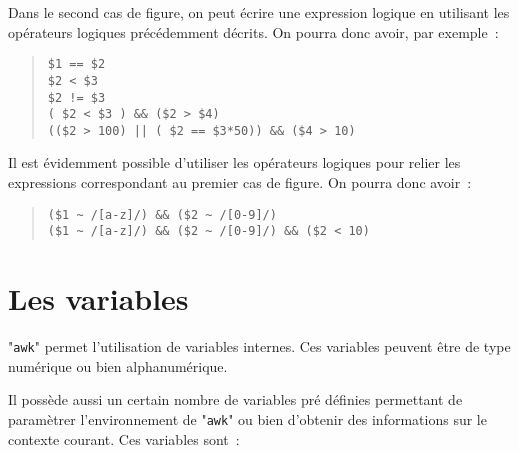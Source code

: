 Dans le second cas de figure, on peut {\'e}crire une expression logique en utilisant
les op{\'e}rateurs logiques pr{\'e}c{\'e}demment d{\'e}crits. On pourra donc avoir, par exemple~:
\begin{quote}
\begin{verbatim}
$1 == $2
$2 < $3
$2 != $3
( $2 < $3 ) && ($2 > $4)
(($2 > 100) || ( $2 == $3*50)) && ($4 > 10)
\end{verbatim}
\end{quote}

Il est {\'e}videmment possible d'utiliser les op{\'e}rateurs logiques pour relier les
expressions correspondant au premier cas de figure. On pourra donc avoir~:
\begin{quote}
\begin{verbatim}
($1 ~ /[a-z]/) && ($2 ~ /[0-9]/)
($1 ~ /[a-z]/) && ($2 ~ /[0-9]/) && ($2 < 10)
\end{verbatim}
\end{quote}

\section{Les variables}

"\texttt{awk}" permet l'utilisation de
variables internes. Ces variables peuvent {\^e}tre de type num{\'e}rique ou bien
alphanum{\'e}rique.

Il poss{\`e}de aussi un certain nombre de variables pr{\'e} d{\'e}finies permettant de
param{\`e}trer l'environnement de "\texttt{awk}" ou bien d'obtenir des informations
sur le contexte courant. Ces variables sont~:

